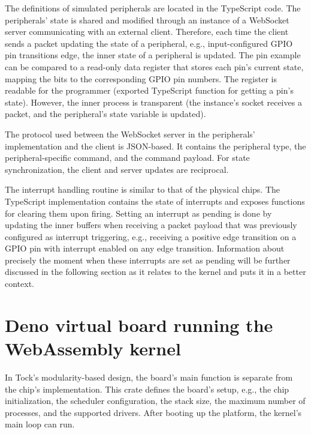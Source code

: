 \documentclass[12pt,a4paper]{report}
\begin{document}
The definitions of simulated peripherals are located in the TypeScript code.
The peripherals' state is shared and modified through an instance of a
WebSocket server communicating with an external client. Therefore, each time the client sends a packet updating the state of a peripheral, e.g., input-configured GPIO pin transitions edge, the inner state of a peripheral is updated. The pin example can be compared to a read-only data register that stores each pin's current state, mapping the bits to the corresponding GPIO pin numbers. The register is readable for the programmer (exported TypeScript function for getting a pin's state). However, the inner process is transparent (the instance's socket receives a packet, and the peripheral's state variable is updated).

The protocol used between the WebSocket server in the peripherals' implementation and the client is JSON-based. It contains the peripheral type, the peripheral-specific command, and the command payload. For state synchronization, the client and server updates are reciprocal.

The interrupt handling routine is similar to that of the physical chips. The TypeScript implementation contains the state of interrupts and exposes functions for clearing them upon firing. Setting an interrupt as pending is done by updating the inner buffers when receiving a packet payload that was previously configured as interrupt triggering, e.g., receiving a positive edge transition on a GPIO pin with interrupt enabled on any edge transition. Information about precisely the moment when these interrupts are set as pending will be further discussed in the following section as it relates to the kernel and puts it in a better context.



\section{Deno virtual board running the WebAssembly kernel}

In Tock's modularity-based design, the board's main function is separate from the chip's implementation. This crate defines the board's setup, e.g., the chip initialization, the scheduler configuration, the stack size, the maximum number of processes, and the supported drivers. After booting up the platform, the kernel's main loop can run.
\end{document}
